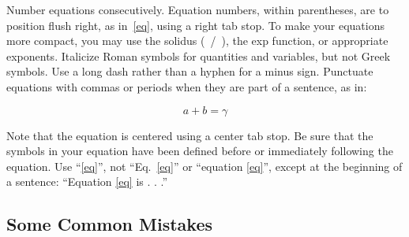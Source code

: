\documentclass[conference, letter]{IEEEtran}
\begin{document}
Number equations consecutively. Equation numbers, within parentheses, are to position flush right, as in~\eqref{eq}, using a right tab stop. To make your equations more compact, you may use the solidus (~/~), the exp function, or appropriate exponents. Italicize Roman symbols for quantities and variables, but not Greek symbols. Use a long dash rather than a hyphen for a minus sign. Punctuate equations with commas or periods when they are part of a sentence, as in:

\begin{equation}
a+b=\gamma\label{eq}
\end{equation}

Note that the equation is centered using a center tab stop. Be sure that the symbols in your equation have been defined before or immediately following the equation. Use ``\eqref{eq}'', not ``Eq.~\eqref{eq}'' or ``equation \eqref{eq}'', except at 
the beginning of a sentence: ``Equation \eqref{eq} is . . .''

\subsection{Some Common Mistakes}\label{SCM}
\end{document}

